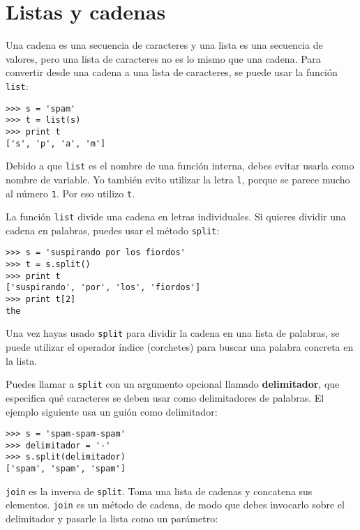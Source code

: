 \section{Listas y cadenas}


Una cadena es una secuencia de caracteres y una lista es una secuencia
de valores, pero una lista de caracteres no es lo mismo que una
cadena. Para convertir desde una cadena a una lista de caracteres,
se puede usar la función {\tt list}:


\beforeverb
\begin{verbatim}
>>> s = 'spam'
>>> t = list(s)
>>> print t
['s', 'p', 'a', 'm']
\end{verbatim}
\afterverb
%
Debido a que {\tt list} es el nombre de una función interna, debes
evitar usarla como nombre de variable. Yo también evito utilizar la letra {\tt l},
porque se parece mucho al número {\tt 1}. Por eso utilizo {\tt t}.

La función {\tt list} divide una cadena en letras individuales. Si
quieres dividir una cadena en palabras, puedes usar el método
{\tt split}:


\beforeverb
\begin{verbatim}
>>> s = 'suspirando por los fiordos'
>>> t = s.split()
>>> print t
['suspirando', 'por', 'los', 'fiordos']
>>> print t[2]
the
\end{verbatim}
\afterverb
%
Una vez hayas usado {\tt split} para dividir la cadena
en una lista de palabras, se puede utilizar el operador índice
(corchetes) para buscar una palabra concreta en la lista.

Puedes llamar a {\tt split} con
un argumento opcional llamado {\bf delimitador}, que
especifica qué caracteres se deben usar como delimitadores de palabras.
El ejemplo siguiente usa un guión como delimitador:


\beforeverb
\begin{verbatim}
>>> s = 'spam-spam-spam'
>>> delimitador = '-'
>>> s.split(delimitador)
['spam', 'spam', 'spam']
\end{verbatim}
\afterverb
%
{\tt join} es la inversa de {\tt split}. Toma
una lista de cadenas y
concatena sus elementos. {\tt join} es un método de cadena,
de modo que debes invocarlo sobre el delimitador y pasarle
la lista como un parámetro:

